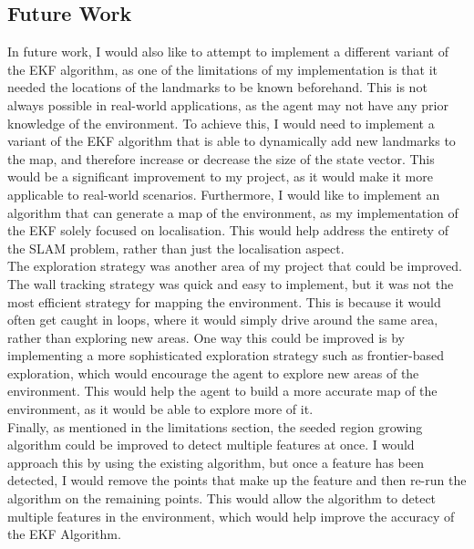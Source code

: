 \documentclass[12pt]{article}
\begin{document}
\subsection{Future Work}
In future work, I would also like to attempt to implement a different variant of the EKF algorithm, as one of the limitations of my implementation
is that it needed the locations of the landmarks to be known beforehand. This is not always possible in real-world applications, as the agent
may not have any prior knowledge of the environment. To achieve this, I would need to implement a variant of the EKF algorithm that is able
to dynamically add new landmarks to the map, and therefore increase or decrease the size of the state vector. This would be a significant
improvement to my project, as it would make it more applicable to real-world scenarios. Furthermore, I would like to implement an algorithm
that can generate a map of the environment, as my implementation of the EKF solely focused on localisation. This would help address the
entirety of the SLAM problem, rather than just the localisation aspect.\\

The exploration strategy was another area of my project that could be improved. The wall tracking strategy was quick and easy to implement,
but it was not the most efficient strategy for mapping the environment. This is because it would often get caught in loops, where it would simply
drive around the same area, rather than exploring new areas. One way this could be improved is by implementing a more sophisticated exploration strategy
such as frontier-based exploration, which would encourage the agent to explore new areas of the environment. This would help the agent to build
a more accurate map of the environment, as it would be able to explore more of it.\\

Finally, as mentioned in the limitations section, the seeded region growing algorithm could be improved to detect multiple features at once.
I would approach this by using the existing algorithm, but once a feature has been detected, I would remove the points that make up the feature
and then re-run the algorithm on the remaining points. This would allow the algorithm to detect multiple features in the environment, which would
help improve the accuracy of the EKF Algorithm.\\
\end{document}
